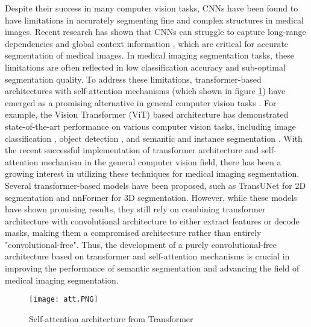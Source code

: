 \documentclass{article}
\begin{document}
Despite their success in many computer vision tasks, CNNs have been found to have limitations in accurately segmenting fine and complex structures in medical images. Recent research has shown that CNNs can struggle to capture long-range dependencies and global context information \cite{15}, which are critical for accurate segmentation of medical images. In medical imaging segmentation tasks, these limitations are often reflected in low classification accuracy and sub-optimal segmentation quality. To address these limitations, transformer-based architectures with self-attention mechanisms (which shown in figure \ref{fig:1}) have emerged as a promising alternative in general computer vision tasks \cite{17}. For example, the Vision Transformer (ViT) \cite{15} based architecture has demonstrated state-of-the-art performance on various computer vision tasks, including image classification \cite{18}, object detection \cite{19}, and semantic and instance segmentation \cite{20}. With the recent successful implementation of transformer architecture and self-attention mechanism in the general computer vision field, there has been a growing interest in utilizing these techniques for medical imaging segmentation. Several transformer-based models have been proposed, such as TransUNet \cite{21} for 2D segmentation and nnFormer \cite{23} for 3D segmentation. However, while these models have shown promising results, they still rely on combining transformer architecture with convolutional architecture to either extract features or decode masks, making them a compromised architecture rather than entirely "convolutional-free". Thus, the development of a purely convolutional-free architecture based on transformer and self-attention mechanisms is crucial in improving the performance of semantic segmentation and advancing the field of medical imaging segmentation.

\begin{figure}
    \centering
    \texttt{[image: att.PNG]} 
    \caption{Self-attention architecture from Transformer \cite{16}}
    \label{fig:1}
\end{figure}
\end{document}
